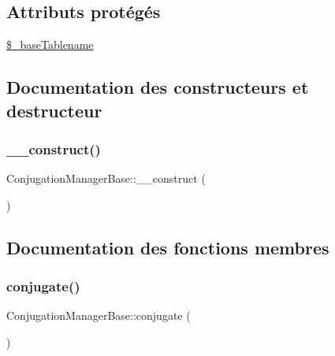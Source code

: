 \subsection*{Attributs protégés}
\begin{DoxyCompactItemize}
\item 
\hyperlink{class_conjugation_manager_base_a9c3e02fa3b9610f261885b032164d81b}{\$\+\_\+base\+Tablename}
\end{DoxyCompactItemize}


\subsection{Documentation des constructeurs et destructeur}
\hypertarget{class_conjugation_manager_base_acd24299a322cb51e4d8ce95e65595f30}{}\label{class_conjugation_manager_base_acd24299a322cb51e4d8ce95e65595f30} 
\subsubsection{\texorpdfstring{\+\_\+\+\_\+construct()}{\_\_construct()}}
{\footnotesize\ttfamily Conjugation\+Manager\+Base\+::\+\_\+\+\_\+construct (\begin{DoxyParamCaption}{ }\end{DoxyParamCaption})}



\subsection{Documentation des fonctions membres}
\hypertarget{class_conjugation_manager_base_a20e28aa17935e10b1a763b39a3c4fdf3}{}\label{class_conjugation_manager_base_a20e28aa17935e10b1a763b39a3c4fdf3} 
\subsubsection{\texorpdfstring{conjugate()}{conjugate()}}
{\footnotesize\ttfamily Conjugation\+Manager\+Base\+::conjugate (\begin{DoxyParamCaption}{ }\end{DoxyParamCaption})}



